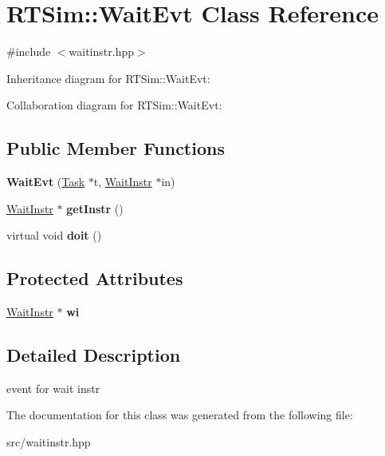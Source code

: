 \hypertarget{classRTSim_1_1WaitEvt}{}\section{R\+T\+Sim\+:\+:Wait\+Evt Class Reference}
\label{classRTSim_1_1WaitEvt}


{\ttfamily \#include $<$waitinstr.\+hpp$>$}



Inheritance diagram for R\+T\+Sim\+:\+:Wait\+Evt\+:


Collaboration diagram for R\+T\+Sim\+:\+:Wait\+Evt\+:
\subsection*{Public Member Functions}
\begin{DoxyCompactItemize}
\item 
{\bfseries Wait\+Evt} (\hyperlink{classRTSim_1_1Task}{Task} $\ast$t, \hyperlink{classRTSim_1_1WaitInstr}{Wait\+Instr} $\ast$in)\hypertarget{classRTSim_1_1WaitEvt_a9079f063653201bc8d7394620216be8f}{}\label{classRTSim_1_1WaitEvt_a9079f063653201bc8d7394620216be8f}

\item 
\hyperlink{classRTSim_1_1WaitInstr}{Wait\+Instr} $\ast$ {\bfseries get\+Instr} ()\hypertarget{classRTSim_1_1WaitEvt_a8fe9c33a2f98227567cdb8c50c589fb3}{}\label{classRTSim_1_1WaitEvt_a8fe9c33a2f98227567cdb8c50c589fb3}

\item 
virtual void {\bfseries doit} ()\hypertarget{classRTSim_1_1WaitEvt_abd8b3b402a633601f4c323b2a6569f96}{}\label{classRTSim_1_1WaitEvt_abd8b3b402a633601f4c323b2a6569f96}

\end{DoxyCompactItemize}
\subsection*{Protected Attributes}
\begin{DoxyCompactItemize}
\item 
\hyperlink{classRTSim_1_1WaitInstr}{Wait\+Instr} $\ast$ {\bfseries wi}\hypertarget{classRTSim_1_1WaitEvt_a9a60c4610f3326e1b3a16c17b3eb3977}{}\label{classRTSim_1_1WaitEvt_a9a60c4610f3326e1b3a16c17b3eb3977}

\end{DoxyCompactItemize}


\subsection{Detailed Description}
event for wait instr 

The documentation for this class was generated from the following file\+:\begin{DoxyCompactItemize}
\item 
src/waitinstr.\+hpp\end{DoxyCompactItemize}
